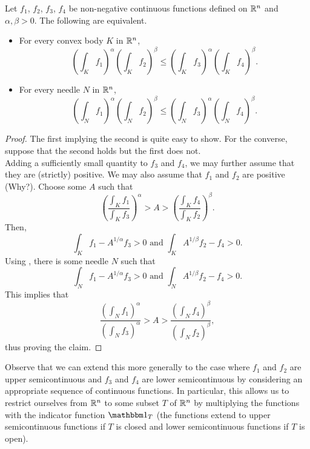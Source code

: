 \documentclass{article}
\begin{document}
		\begin{lemma}
			\label{lem: 5.1}
			Let $f_1$, $f_2$, $f_3$, $f_4$ be non-negative continuous functions defined on $\mathbb{R}^n$ and $\alpha,\beta>0$. The following are equivalent.
			\begin{itemize}
				\item For every convex body $K$ in $\mathbb{R}^n$,
					\[ \left(\int_K f_1\right)^\alpha \left(\int_K f_2\right)^\beta \leq \left(\int_K f_3\right)^\alpha \left(\int_K f_4\right)^\beta. \]
				\item For every needle $N$ in $\mathbb{R}^n$,
					\[ \left(\int_N f_1\right)^\alpha \left(\int_N f_2\right)^\beta \leq \left(\int_N f_3\right)^\alpha \left(\int_N f_4\right)^\beta. \]
			\end{itemize}
		\end{lemma}
		\begin{proof}
			The first implying the second is quite easy to show. For the converse, suppose that the second holds but the first does not.\\
			Adding a sufficiently small quantity to $f_3$ and $f_4$, we may further assume that they are (strictly) positive. We may also assume that $f_1$ and $f_2$ are positive (Why?). Choose some $A$ such that
			\[ \left(\frac{\int_K f_1}{\int_K f_3}\right)^\alpha > A > \left(\frac{\int_K f_4}{\int_K f_2}\right)^\beta. \]
			Then,
			\[ \int_K f_1 - A^{1/\alpha}f_3 > 0 \text{ and } \int_K A^{1/\beta}f_2 - f_4 > 0. \]
			Using , there is some needle $N$ such that
			\[ \int_N f_1 - A^{1/\alpha}f_3 > 0 \text{ and } \int_N A^{1/\beta}f_2 - f_4 > 0. \]
			This implies that
			\[ \frac{\left(\int_N f_1\right)^\alpha}{\left(\int_N f_3\right)^\alpha} > A > \frac{\left(\int_N f_4\right)^\beta}{\left(\int_N f_2\right)^\beta}, \]
			thus proving the claim.
		\end{proof}

		Observe that we can extend this more generally to the case where $f_1$ and $f_2$ are upper semicontinuous and $f_3$ and $f_4$ are lower semicontinuous by considering an appropriate sequence of continuous functions. In particular, this allows us to restrict ourselves from $\mathbb{R}^n$ to some subset $T$ of $\mathbb{R}^n$ by multiplying the functions with the indicator function $\indic_T$ (the functions extend to upper semicontinuous functions if $T$ is closed and lower semicontinuous functions if $T$ is open).
\end{document}
